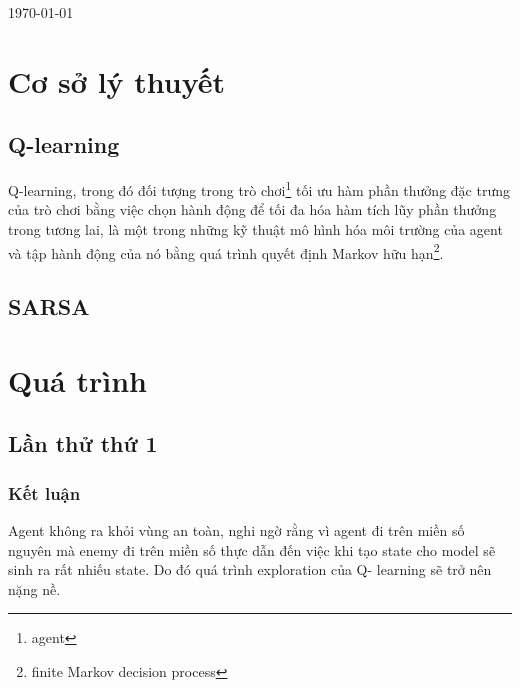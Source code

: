\documentclass[12pt,a4paper]{article}
\begin{document}
\begin{titlepage}
	\vfill\vfill\vfill %
	
	{\large\today} %
	
	
	 
	
	\vfill %
	
\end{titlepage}
\clearpage
\tableofcontents
\clearpage
\section{Cơ sở lý thuyết}
\subsection{Q-learning}
Q-learning, trong đó đối tượng trong trò chơi\footnote{agent} tối ưu hàm phần thưởng đặc trưng của trò chơi bằng việc chọn hành động để tối đa hóa hàm tích lũy phần thưởng trong tương lai, là một trong những kỹ thuật mô hình hóa môi trường của agent và tập hành động của nó bằng quá trình quyết định Markov hữu hạn\footnote{finite Markov decision process}.\\
\subsection{SARSA}
\section{Quá trình}
\subsection{Lần thử thứ 1}
\subsubsection{Kết luận}
Agent không ra khỏi vùng an toàn, nghi ngờ rằng vì agent đi trên miền số nguyên mà enemy đi trên miền số thực dẫn đến việc khi tạo state cho model sẽ sinh ra rất nhiếu state. Do đó quá trình exploration của Q- learning sẽ trở nên nặng nề. 
\clearpage
\end{document}
